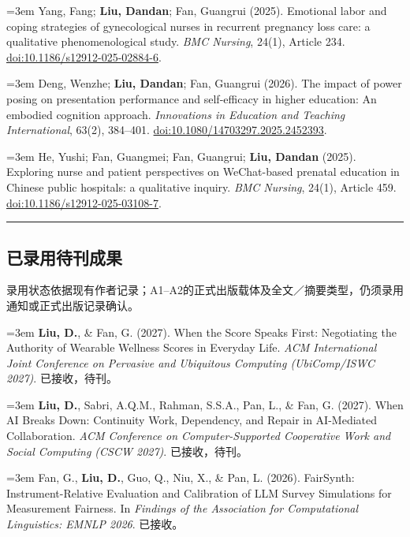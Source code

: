 \documentclass[a4paper,11pt]{article}
\newcommand{\hsep}{\noindent\textcolor{teal}{\rule{\textwidth}{0.5pt}}}
\newcommand{\block}[1]{\par\addvspace{7pt}\Needspace{5\baselineskip}\hsep\vspace{-8pt}\subsection*{#1}}
\newcommand{\publication}[2]{%
  \par\addvspace{8pt}\noindent
  \begin{minipage}{\linewidth}
    \linespread{1.06}\fontsize{10.8}{13.4}\selectfont\raggedright
    \hangindent=3em\hangafter=1
    \makebox[3em][l]{\textcolor{teal}{[#1]}}#2
  \end{minipage}\par}
\begin{document}
\publication{J10}{Yang, Fang; \textbf{Liu, Dandan}; Fan, Guangrui (2025). Emotional labor and coping strategies of gynecological nurses in recurrent pregnancy loss care: a qualitative phenomenological study. \emph{BMC Nursing}, 24(1), Article 234. \href{https://doi.org/10.1186/s12912-025-02884-6}{doi:10.1186/s12912-025-02884-6}.}

\publication{J11}{Deng, Wenzhe; \textbf{Liu, Dandan}; Fan, Guangrui (2026). The impact of power posing on presentation performance and self-efficacy in higher education: An embodied cognition approach. \emph{Innovations in Education and Teaching International}, 63(2), 384--401. \href{https://doi.org/10.1080/14703297.2025.2452393}{doi:10.1080/14703297.2025.2452393}.}

\publication{J12}{He, Yushi; Fan, Guangmei; Fan, Guangrui; \textbf{Liu, Dandan} (2025). Exploring nurse and patient perspectives on WeChat-based prenatal education in Chinese public hospitals: a qualitative inquiry. \emph{BMC Nursing}, 24(1), Article 459. \href{https://doi.org/10.1186/s12912-025-03108-7}{doi:10.1186/s12912-025-03108-7}.}


\block{已录用待刊成果}
{\small 录用状态依据现有作者记录；A1--A2的正式出版载体及全文／摘要类型，仍须录用通知或正式出版记录确认。}\par
\publication{A1}{\textbf{Liu, D.}, \& Fan, G. (2027). When the Score Speaks First: Negotiating the Authority of Wearable Wellness Scores in Everyday Life. \emph{ACM International Joint Conference on Pervasive and Ubiquitous Computing (UbiComp/ISWC 2027)}. 已接收，待刊。}

\publication{A2}{\textbf{Liu, D.}, Sabri, A.Q.M., Rahman, S.S.A., Pan, L., \& Fan, G. (2027). When AI Breaks Down: Continuity Work, Dependency, and Repair in AI-Mediated Collaboration. \emph{ACM Conference on Computer-Supported Cooperative Work and Social Computing (CSCW 2027)}. 已接收，待刊。}

\publication{A3}{Fan, G., \textbf{Liu, D.}, Guo, Q., Niu, X., \& Pan, L. (2026). FairSynth: Instrument-Relative Evaluation and Calibration of LLM Survey Simulations for Measurement Fairness. In \emph{Findings of the Association for Computational Linguistics: EMNLP 2026}. 已接收。}
\end{document}
